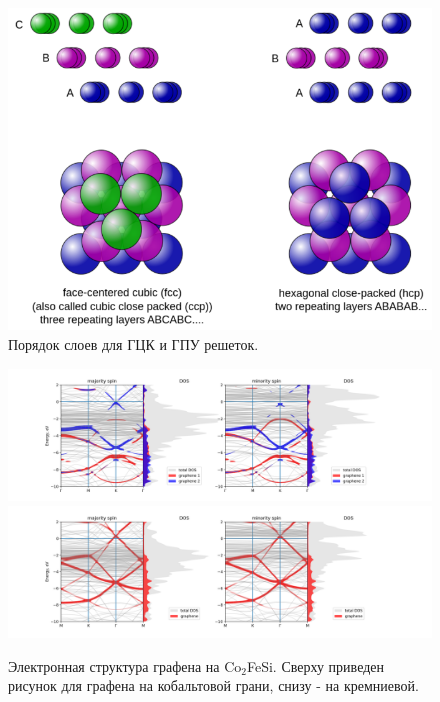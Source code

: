\begin{figure}[h]
    \centering
    \includegraphics[scale=0.4]{images/Closepacking.svg_.png}
    \caption{Порядок слоев для ГЦК и ГПУ решеток. }
    \label{fig:fcc_vs_hcp}
\end{figure}

\begin{figure}[h]
    \centering
    \includegraphics[scale=0.5]{images/co2fesi-graphene00000-100920.png}
    \includegraphics[scale=0.5]{images/co2fesi-graphene-sico2-080920.png}
    \caption{Электронная структура графена на Co$_2$FeSi. Сверху приведен рисунок для графена на кобальтовой грани, снизу - на кремниевой.}
    \label{fig:bands-graphene-cofe}
\end{figure}

